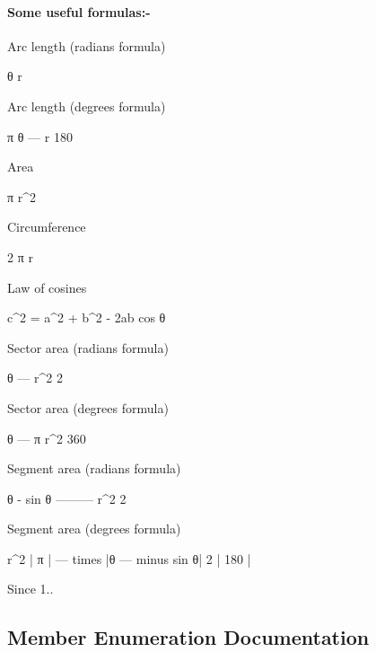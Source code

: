 \paragraph*{Some useful formulas\+:-\/}

Arc length (radians formula) 
\begin{DoxyCode}
θ r
\end{DoxyCode}


Arc length (degrees formula) 
\begin{DoxyCode}
   π
θ --- r
  180
\end{DoxyCode}


Area 
\begin{DoxyCode}
π r^2
\end{DoxyCode}


Circumference 
\begin{DoxyCode}
2 π r
\end{DoxyCode}


Law of cosines 
\begin{DoxyCode}
c^2 = a^2 + b^2 - 2ab cos θ
\end{DoxyCode}


Sector area (radians formula) 
\begin{DoxyCode}
 θ
--- r^2
 2
\end{DoxyCode}


Sector area (degrees formula) 
\begin{DoxyCode}
 θ
--- π r^2
360
\end{DoxyCode}


Segment area (radians formula) 
\begin{DoxyCode}
θ - sin θ
--------- r^2
    2
\end{DoxyCode}


Segment area (degrees formula) 
\begin{DoxyCode}
r^2       |   π              |
--- times |θ ---  minus sin θ|
 2        |  180             |
\end{DoxyCode}
\begin{DoxySince}{Since}
1.. 
\end{DoxySince}


\subsection{Member Enumeration Documentation}
